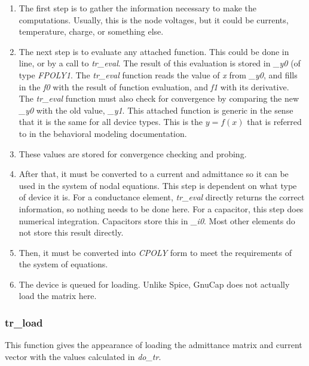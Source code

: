 \begin{enumerate}

\item The first step is to gather the information necessary to make
the computations.  Usually, this is the node voltages, but it could be 
currents, temperature, charge, or something else.

\item The next step is to evaluate any attached function.  This could
be done in line, or by a call to {\em tr\_eval}.  The result of this
evaluation is stored in {\em \_y0} (of type {\em FPOLY1}.  The {\em tr\_eval} 
function reads the value of {\em x} from {\em \_y0}, and fills in the
{\em f0} with the result of function evaluation, and {\em f1} with its 
derivative.  The {\em tr\_eval} function must also check for
convergence by comparing the new {\em \_y0} with the old value, {\em
\_y1}.  This attached function is generic in the sense that it is the
same for all device types.  This is the $y = f(x)$ that is referred to 
in the behavioral modeling documentation.

\item These values are stored for convergence checking and probing.

\item After that, it must be converted to a current and admittance so
it can be used in the system of nodal equations.  This step is
dependent on what type of device it is.  For a conductance element,
{\em tr\_eval} directly returns the correct information, so nothing
needs to be done here.  For a capacitor, this step does numerical
integration.  Capacitors store this in {\em \_i0}.  Most other elements 
do not store this result directly.

\item Then, it must be converted into {\em CPOLY} form to meet the
requirements of the system of equations.

\item The device is queued for loading.  Unlike Spice, GnuCap does not
actually load the matrix here.

\end{enumerate}


\subsubsection{tr\_load}

This function gives the appearance of loading the admittance matrix
and current vector with the values calculated in {\em do\_tr}.

